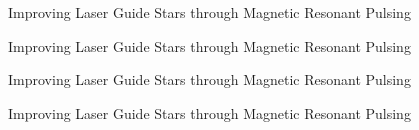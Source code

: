 \documentclass[]{article}
\begin{document}
\begin{center}
\Huge
Improving Laser Guide Stars through Magnetic Resonant Pulsing\\

\vspace{3cm}

Improving Laser Guide Stars through Magnetic Resonant Pulsing\\

\vspace{3cm}

Improving Laser Guide Stars through Magnetic Resonant Pulsing\\

\vspace{3cm}

Improving Laser Guide Stars through Magnetic Resonant Pulsing\\
\end{center}
\end{document}
